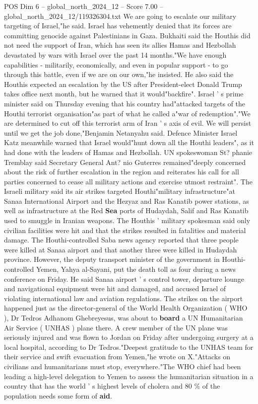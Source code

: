 \begin{textsample}{POS Dim 6 – global\_north\_2024\_12 – Score 7.00 – global\_north\_2024\_12/119326304.txt}
We are going to escalate our military targeting of Israel,"he said.
Israel has vehemently denied that its forces are committing genocide against Palestinians in Gaza.
Bukhaiti said the Houthis did not need the support of Iran, which has seen its allies Hamas and Hezbollah devastated by wars with Israel over the past 14 months."We have enough capabilities - militarily, economically, and even in popular support - to go through this battle, even if we are on our own,"he insisted.
He also said the Houthis expected an escalation by the US after President-elect Donald Trump takes office next month, but he warned that it would"backfire".
Israel ' s prime minister said on Thursday evening that his country had"attacked targets of the Houthi terrorist organisation"as part of what he called a"war of redemption"."We are determined to cut off this terrorist arm of Iran ' s axis of evil.
We will persist until we get the job done,"Benjamin Netanyahu said.
Defence Minister Israel Katz meanwhile warned that Israel would"hunt down all the Houthi leaders", as it had done with the leaders of Hamas and Hezbollah.
UN spokeswoman St? phanie Tremblay said Secretary General Ant? nio Guterres remained"deeply concerned about the risk of further escalation in the region and reiterates his call for all parties concerned to cease all military actions and exercise utmost restraint".
The Israeli military said its air strikes targeted Houthi"military infrastructure"at Sanaa International Airport and the Hezyaz and Ras Kanatib power stations, as well as infrastructure at the Red \textbf{Sea} ports of Hudaydah, Salif and Ras Kanatib used to smuggle in Iranian weapons.
The Houthis ' military spokesman said only civilian facilities were hit and that the strikes resulted in fatalities and material damage.
The Houthi-controlled Saba news agency reported that three people were killed at Sanaa airport and that another three were killed in Hudaydah province.
However, the deputy transport minister of the government in Houthi-controlled Yemen, Yahya al-Sayani, put the death toll as four during a news conference on Friday.
He said Sanaa airport ' s control tower, departure lounge and navigational equipment were hit and damaged, and accused Israel of violating international law and aviation regulations.
The strikes on the airport happened just as the director-general of the World Health Organization ( WHO ), Dr Tedros Adhanom Ghebreyesus, was about to \textbf{board} a UN Humanitarian Air Service ( UNHAS ) plane there.
A crew member of the UN plane was seriously injured and was flown to Jordan on Friday after undergoing surgery at a local hospital, according to Dr Tedros."Deepest gratitude to the UNHAS team for their service and swift evacuation from Yemen,"he wrote on X."Attacks on civilians and humanitarians must stop, everywhere."The WHO chief had been leading a high-level delegation to Yemen to assess the humanitarian situation in a country that has the world ' s highest levels of cholera and 80 \% of the population needs some form of \textbf{aid}.

\end{textsample}
